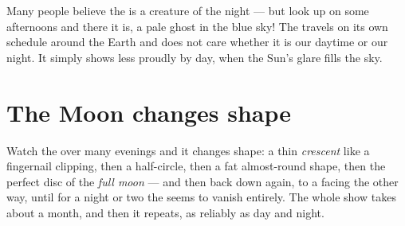 \begin{remark}\label{rem:g2:moon-in-the-sky:daytime}
Many people believe the  is a creature of the night --- but look
up on some afternoons and there it is, a pale ghost in the blue sky!
The  travels on its own schedule around the Earth and does not
care whether it is our daytime or our night. It simply shows less
proudly by day, when the Sun's glare fills the sky.
\end{remark}

\section{The Moon changes shape}

\begin{example}\label{ex:g2:moon-in-the-sky:shapes}
Watch the  over many evenings and it changes shape: a thin
\emph{crescent} like a fingernail clipping, then a
half-circle, then a fat almost-round shape, then the perfect disc of
the \emph{full moon} --- and then back down again,
to a  facing the other way, until for a night or two the
 seems to vanish entirely. The whole show takes about a month,
and then it repeats, as reliably as day and night.
\end{example}

